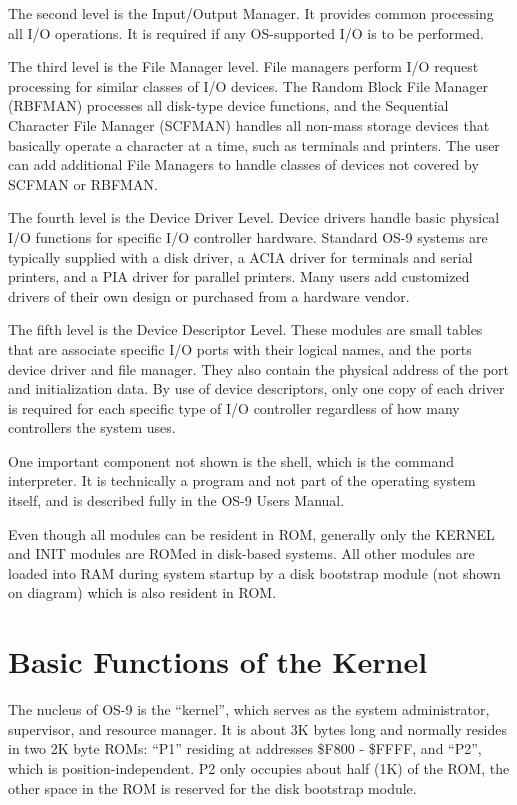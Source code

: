 \documentclass[
]{article}
\begin{document}
The second level is the Input/Output Manager. It provides common
processing all I/O operations. It is required if any OS-supported I/O is
to be performed.

The third level is the File Manager level. File managers perform I/O
request processing for similar classes of I/O devices. The Random Block
File Manager (RBFMAN) processes all disk-type device functions, and the
Sequential Character File Manager (SCFMAN) handles all non-mass storage
devices that basically operate a character at a time, such as terminals
and printers. The user can add additional File Managers to handle
classes of devices not covered by SCFMAN or RBFMAN.

The fourth level is the Device Driver Level. Device drivers handle basic
physical I/O functions for specific I/O controller hardware. Standard
OS-9 systems are typically supplied with a disk driver, a ACIA driver
for terminals and serial printers, and a PIA driver for parallel
printers. Many users add customized drivers of their own design or
purchased from a hardware vendor.

The fifth level is the Device Descriptor Level. These modules are small
tables that are associate specific I/O ports with their logical names,
and the port\textquotesingle s device driver and file manager. They also
contain the physical address of the port and initialization data. By use
of device descriptors, only one copy of each driver is required for each
specific type of I/O controller regardless of how many controllers the
system uses.

One important component not shown is the shell, which is the command
interpreter. It is technically a program and not part of the operating
system itself, and is described fully in the OS-9 Users Manual.

Even though all modules can be resident in ROM, generally only the
KERNEL and INIT modules are ROMed in disk-based systems. All other
modules are loaded into RAM during system startup by a disk bootstrap
module (not shown on diagram) which is also resident in ROM.

\section{Basic Functions of the Kernel}

The nucleus of OS-9 is the ``kernel'', which serves as the system
administrator, supervisor, and resource manager. It is about 3K bytes
long and normally resides in two 2K byte ROMs: ``P1'' residing at
addresses \$F800 - \$FFFF, and ``P2'', which is position-independent. P2
only occupies about half (1K) of the ROM, the other space in the ROM is
reserved for the disk bootstrap module.
\end{document}
